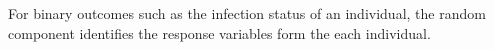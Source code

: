 For binary outcomes such as the infection status of an individual, the random component identifies the response variables form the each individual.
